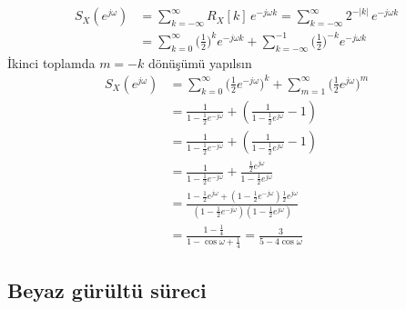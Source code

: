 \documentclass[11pt,a4paper]{article}
\begin{document}
\begin{align*}
  S_X(e^{j\omega}) &= \sum_{k=-\infty}^{\infty}R_X[k]\,e^{-j\omega k}=\sum_{k=-\infty}^{\infty}2^{-|k|}\,e^{-j\omega k}\\
  &= \sum_{k=0}^{\infty}\Big(\frac{1}{2}\Big)^{k}e^{-j\omega k}+\sum_{k=-\infty}^{-1}\Big(\frac{1}{2}\Big)^{-k}e^{-j\omega k}
\end{align*}
İkinci toplamda $m=-k$ dönüşümü yapılsın
\begin{align*}
  S_X(e^{j\omega}) &= \sum_{k=0}^{\infty}\Big(\frac{1}{2}e^{-j\omega}\Big)^{k}+\sum_{m=1}^{\infty}\Big(\frac{1}{2}e^{j\omega}\Big)^{m}\\
  &= \frac{1}{1-\frac{1}{2}e^{-j\omega}}+\left(\frac{1}{1-\frac{1}{2}e^{j\omega}}-1\right)\\
  &= \frac{1}{1-\frac{1}{2}e^{-j\omega}}+\left(\frac{1}{1-\frac{1}{2}e^{j\omega}}-1\right)\\
  &= \frac{1}{1-\frac{1}{2}e^{-j\omega}}+\frac{\frac{1}{2}e^{j\omega}}{1-\frac{1}{2}e^{j\omega}}\\
  &= \frac{1-\frac{1}{2}e^{j\omega}+\left(1-\frac{1}{2}e^{-j\omega}\right)\frac{1}{2}e^{j\omega}}{\left(1-\frac{1}{2}e^{-j\omega}\right)\left(1-\frac{1}{2}e^{j\omega}\right)}\\
  &= \frac{1-\frac{1}{4}}{1-\cos\omega+\frac{1}{4}}=\frac{3}{5-4\cos\omega}
\end{align*}

\subsection{Beyaz gürültü süreci}
\end{document}
